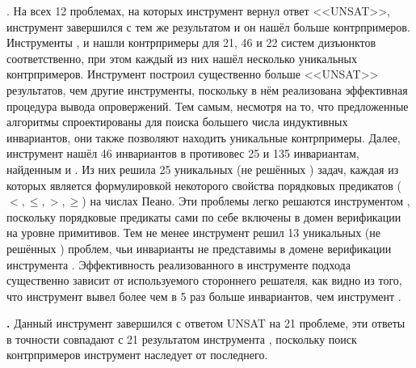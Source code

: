 \textbf{\theringen{}}. На всех 12 проблемах, на которых инструмент \eldarica{} вернул ответ <<UNSAT>>, инструмент \theringen{} завершился с тем же результатом и он нашёл больше контрпримеров.
Инструменты \ringen{\cvc{}}, \ringen{\vampire{}} и \racer{} нашли контрпримеры для 21, 46 и 22 систем дизъюнктов соответственно, при этом каждый из них нашёл несколько уникальных контрпримеров.
Инструмент \ringen{\vampire{}} построил существенно больше <<UNSAT>> результатов, чем другие инструменты, поскольку в нём реализована эффективная процедура вывода опровержений.
Тем самым, несмотря на то, что предложенные алгоритмы спроектированы для поиска большего числа индуктивных инвариантов, они также позволяют находить уникальные контрпримеры.
Далее, инструмент \eldarica{} нашёл 46 инвариантов в противовес 25 и 135 инвариантам, найденным \ringen{\cvc{}} и \ringen{\vampire{}}.
Из них \eldarica{} решила 25 уникальных (не решённых \ringen{\cvc{}}) задач, каждая из которых является формулировкой некоторого свойства порядковых предикатов ($ <, \le,>, \ge $) на числах Пеано.
Эти проблемы легко решаются инструментом \eldarica{}, поскольку порядковые предикаты сами по себе включены в домен верификации \sizeelemclass{} на уровне примитивов.
Тем не менее инструмент \ringen{\cvc{}} решил 13 уникальных (не решённых \eldarica{}) проблем, чьи инварианты не представимы в домене верификации инструмента \eldarica{}.
Эффективность реализованного в инструменте \theringen{} подхода существенно зависит от используемого стороннего решателя, как видно из того, что инструмент \ringen{\vampire{}} вывел более чем в 5 раз больше инвариантов, чем инструмент \ringen{\cvc{}}.


\textbf{\ringenSync{}.} Данный инструмент завершился с ответом UNSAT на 21 проблеме, эти ответы в точности совпадают с 21 результатом инструмента \ringen{\cvc{}}, поскольку поиск контрпримеров инструмент \ringenSync{} наследует от последнего.

